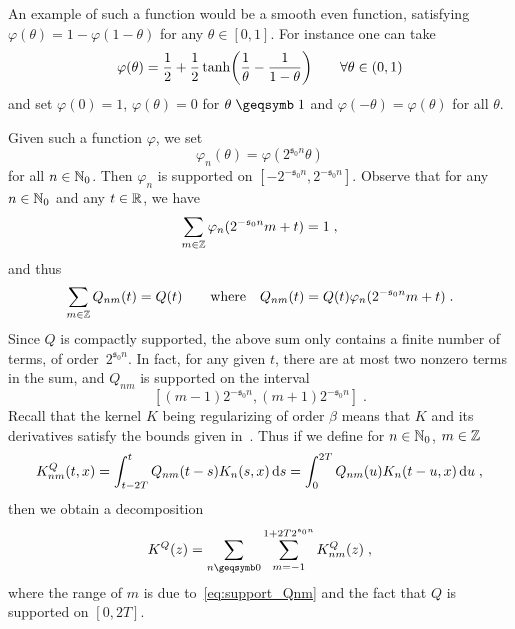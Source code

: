 \documentclass[reqno,11pt]{article}
\def\fraks{\mathfrak{s}}
\begin{document}
\begin{remark}
An example of such a function would be a smooth even function, satisfying
$\varphi(\theta) = 1 - \varphi(1-\theta)$ for any $\theta\in[0,1]$. For instance 
one can take
\begin{equation}
 \varphi(\theta) = \frac12 + \frac12\tanh\biggl(\frac{1}{\theta} - 
\frac1{1-\theta}\biggr)
 \qquad \forall \theta\in(0,1)
\end{equation} 
and set $\varphi(0)=1$, $\varphi(\theta)=0$ for $\theta\geqs1$ and
$\varphi(-\theta)=\varphi(\theta)$ for all $\theta$. 
\end{remark}

Given such a function $\varphi$, we set 
\begin{equation}
 \varphi_n(\theta) = \varphi(2^{\fraks_0n} \theta) 
\end{equation} 
for all $n\in\mathbb{N}_0$. Then $\varphi_n$ is supported on
$[-2^{-\fraks_0n},2^{-\fraks_0n}]$. Observe that for any $n\in\mathbb{N}_0$ and any
$t\in\mathbb{R}$, we have 
\begin{equation}
 \sum_{m\in\Z} \varphi_n(2^{-\fraks_0 n}m + t) = 1\;,
\end{equation} 
and thus 
\begin{equation}
 \sum_{m\in\Z} Q_{nm}(t) = Q(t)
 \qquad
 \text{where}
 \quad 
 Q_{nm}(t) = Q(t)  \varphi_n(2^{-\fraks_0 n}m + t)\;.
\end{equation} 
Since $Q$ is compactly supported, the above sum only contains a finite number
of terms, of order~$2^{\fraks_0 n}$. In fact, for any given $t$, there are at
most two nonzero terms in the sum, and $Q_{nm}$ is supported on the
interval 
\begin{equation}
\label{eq:support_Qnm} 
 [(m-1)2^{-\fraks_0 n}, (m+1)2^{-\fraks_0 n}]\;.
\end{equation} 
Recall that the kernel $K$ being regularizing of order $\beta$ 
means that $K$ and its derivatives satisfy the bounds given 
in~\cite[Assumption~5.1]{Hairer2014}.
Thus if we define for $n\in\mathbb{N}_0$, $m\in\mathbb{Z}$  
\begin{equation}
\nonumber
 K^Q_{nm}(t,x) = \int_{t-2T}^t Q_{nm}(t-s) K_n(s,x) \operatorname{d}\!s
 = \int_0^{2T} Q_{nm}(u) K_n(t-u,x) \operatorname{d}\!u\;,
\end{equation} 
then we obtain a decomposition
\begin{equation}
 K^Q(z) = \sum_{n\geqs0} \sum_{m=-1}^{1+2T2^{\fraks_{0}n}} K^Q_{nm}(z)\;,
\end{equation} 
where the range of $m$ is due to~\eqref{eq:support_Qnm} and the fact that $Q$
is supported on $[0,2T]$. 
\end{document}
